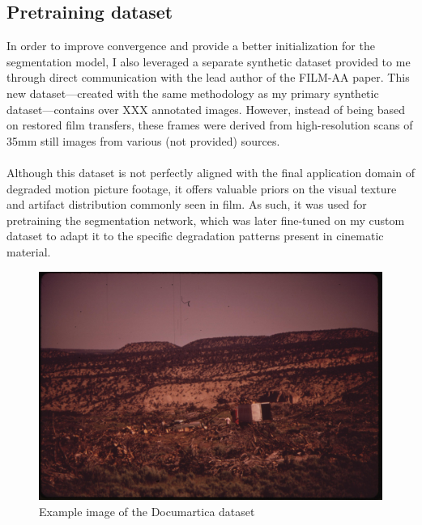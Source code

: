 \documentclass[openany, 12pt]{article}
\begin{document}
{	\subsection{Pretraining dataset}
	In order to improve convergence and provide a better initialization for the segmentation model, I also leveraged a separate synthetic dataset provided to me through direct communication with the lead author of the FILM-AA paper. This new dataset—created with the same methodology as my primary synthetic dataset—contains over XXX annotated images. However, instead of being based on restored film transfers, these frames were derived from high-resolution scans of 35mm still images from various (not provided) sources.\\\\
	Although this dataset is not perfectly aligned with the final application domain of degraded motion picture footage, it offers valuable priors on the visual texture and artifact distribution commonly seen in film. As such, it was used for pretraining the segmentation network, which was later fine-tuned on my custom dataset to adapt it to the specific degradation patterns present in cinematic material.
			\begin{figure}[h!]
		\centering
\includegraphics[width=0.5\linewidth]{images/docum.jpg}
		\caption{\smaller Example image of the Documartica dataset} 
	\end{figure}
	
}
\end{document}
